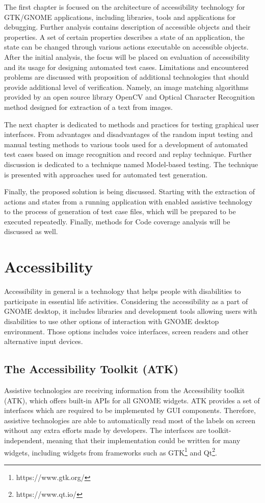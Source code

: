 The first chapter is focused on the architecture of accessibility technology for GTK/GNOME applications, including libraries, tools and applications for debugging. Further analysis contains description of accessible objects and their properties. A set of certain properties describes a state of an application, the state can be changed through various actions executable on accessible objects. After the initial analysis, the focus will be placed on evaluation of accessibility and its usage for designing automated test cases. Limitations and encountered problems are discussed with proposition of additional technologies that should provide additional level of verification. Namely, an image matching algorithms provided by an open source library OpenCV and Optical Character Recognition method designed for extraction of a text from images.

The next chapter is dedicated to methods and practices for testing graphical user interfaces. From advantages and disadvantages of the random input testing and manual testing methods to various tools used for a development of automated test cases based on image recognition and record and replay technique. Further discussion is dedicated to a technique named Model-based testing. The technique is presented with approaches used for automated test generation. 

Finally, the proposed solution is being discussed. Starting with the extraction of actions and states from a running application with enabled assistive technology to the process of generation of test case files, which will be prepared to be executed repeatedly. Finally, methods for Code coverage analysis will be discussed as well. 

\chapter{Accessibility}
Accessibility in general is a technology that helps people with disabilities to participate in essential life activities. Considering the accessibility as a part of GNOME desktop, it includes libraries and development tools allowing users with disabilities to use other options of interaction with GNOME desktop environment. Those options includes voice interfaces, screen readers and other alternative input devices.\cite{gnomeADG}
\section{The Accessibility Toolkit (ATK)}
Assistive technologies are receiving information from the Accessibility toolkit (ATK), which offers built-in APIs for all GNOME widgets. ATK provides a set of interfaces which are required to be implemented by GUI components. Therefore, assistive technologies are able to automatically read most of the labels on screen without any extra efforts made by developers. The interfaces are toolkit-independent, meaning that their implementation could be written for many widgets, including widgets from frameworks such as GTK\footnote{https://www.gtk.org/} and Qt\footnote{https://www.qt.io/}.

